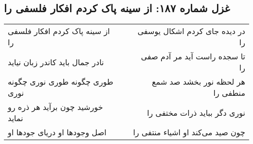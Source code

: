 \begin{center}
\section*{غزل شماره ۱۸۷: از سینه پاک کردم افکار فلسفی را}
\label{sec:0187}
\begin{longtable}{l p{0.5cm} r}
از سینه پاک کردم افکار فلسفی را
&&
در دیده جای کردم اشکال یوسفی را
\\
نادر جمال باید کاندر زبان نیاید
&&
تا سجده راست آید مر آدم صفی را
\\
طوری چگونه طوری نوری چگونه نوری
&&
هر لحظه نور بخشد صد شمع منطفی را
\\
خورشید چون برآید هر ذره رو نماید
&&
نوری دگر بباید ذرات مختفی را
\\
اصل وجودها او دریای جودها او
&&
چون صید می‌کند او اشیاء منتفی را
\\
\end{longtable}
\end{center}
